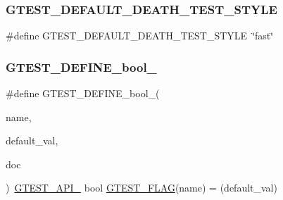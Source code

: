 \subsubsection{\texorpdfstring{GTEST\_DEFAULT\_DEATH\_TEST\_STYLE}{GTEST\_DEFAULT\_DEATH\_TEST\_STYLE}}
{\footnotesize\ttfamily \#define G\+T\+E\+S\+T\+\_\+\+D\+E\+F\+A\+U\+L\+T\+\_\+\+D\+E\+A\+T\+H\+\_\+\+T\+E\+S\+T\+\_\+\+S\+T\+Y\+LE~\char`\"{}fast\char`\"{}}

\mbox{\label{_obj__test_2lib_2googletest-release-1_88_81_2googletest_2include_2gtest_2internal_2gtest-port_8h_a48e05814779e5a2f432b06a12618a760}} 
\subsubsection{\texorpdfstring{GTEST\_DEFINE\_bool\_}{GTEST\_DEFINE\_bool\_}}
{\footnotesize\ttfamily \#define G\+T\+E\+S\+T\+\_\+\+D\+E\+F\+I\+N\+E\+\_\+bool\+\_\+(\begin{DoxyParamCaption}\item[{}]{name,  }\item[{}]{default\+\_\+val,  }\item[{}]{doc }\end{DoxyParamCaption})~\mbox{\hyperlink{_obj__test_2lib_2googletest-release-1_88_81_2googletest_2include_2gtest_2internal_2gtest-port_8h_aa73be6f0ba4a7456180a94904ce17790}{G\+T\+E\+S\+T\+\_\+\+A\+P\+I\+\_\+}} bool \mbox{\hyperlink{_obj__test_2lib_2googletest-release-1_88_81_2googletest_2include_2gtest_2internal_2gtest-port_8h_a828f4e34a1c4b510da50ec1563e3562a}{G\+T\+E\+S\+T\+\_\+\+F\+L\+AG}}(name) = (default\+\_\+val)}

\mbox{\label{_obj__test_2lib_2googletest-release-1_88_81_2googletest_2include_2gtest_2internal_2gtest-port_8h_a88ee2f19589ffff86ca742fd33611358}} 
